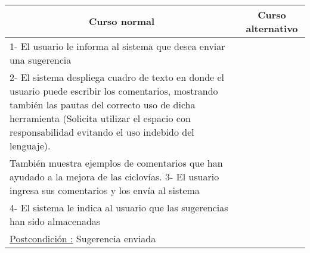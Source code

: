~

\begin{center}
    \centering
    \begin{tabular}{ | p{11cm} | p{6cm} | }
    	\multicolumn{1}{c}{\cellcolor{black!30}\textbf{Curso normal}} & 
    	\multicolumn{1}{c}{\cellcolor{black!30}\textbf{Curso alternativo}} \\
		\hline
		1- El usuario le informa al sistema que desea enviar una sugerencia & \\ \hline
		2- El sistema despliega cuadro de texto en donde el usuario puede escribir los comentarios,
		mostrando también las pautas del correcto uso de dicha herramienta (Solicita
		utilizar el espacio con
		responsabilidad evitando el uso indebido del lenguaje). & \\ \hline
		También muestra ejemplos de comentarios que han ayudado a la mejora de las ciclovías.
		3- El usuario ingresa sus comentarios y los envía al sistema & \\ \hline
		4- El sistema le indica al usuario que las sugerencias han sido almacenadas & \\ \hline
		\underline{Postcondición :} Sugerencia enviada & \\ \hline
    \end{tabular}
\end{center}




